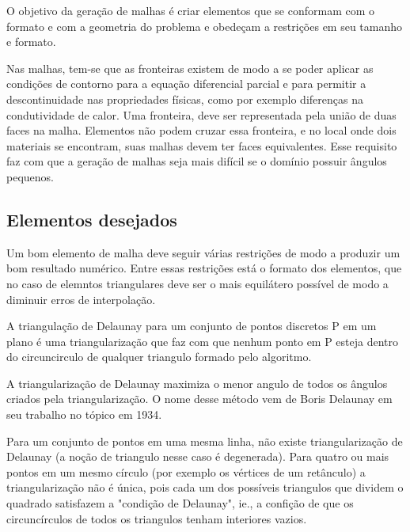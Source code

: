 O objetivo da geração de malhas é criar elementos que se conformam com o formato e com a geometria do problema e obedeçam a restrições em seu tamanho e formato.

Nas malhas, tem-se que as fronteiras existem de modo a se poder aplicar as condições de contorno para a equação diferencial parcial e para permitir a descontinuidade nas propriedades físicas, como por exemplo diferenças na condutividade de calor. Uma fronteira, deve ser representada pela união de duas faces na malha. Elementos não podem cruzar essa fronteira, e no local onde dois materiais se encontram, suas malhas devem ter faces equivalentes. Esse requisito faz com que a geração de malhas seja mais difícil se o domínio possuir ângulos pequenos.

\subsection{Elementos desejados}
Um bom elemento de malha deve seguir várias restrições de modo a produzir um bom resultado numérico. Entre essas restrições está o formato dos elementos, que no caso de elemntos triangulares deve ser o mais equilátero possível de modo a diminuir erros de interpolação.

A triangulação de Delaunay para um conjunto de pontos discretos P em um plano é uma triangularização que faz com que nenhum ponto em P esteja dentro do circuncirculo de qualquer triangulo formado pelo algoritmo.

A triangularização de Delaunay maximiza o menor angulo de todos os ângulos criados pela triangularização. O nome desse método vem de Boris Delaunay em seu trabalho no tópico em 1934.

Para um conjunto de pontos em uma mesma linha, não existe triangularização de Delaunay (a noção de triangulo nesse caso é degenerada). Para quatro ou mais pontos em um mesmo círculo (por exemplo os vértices de um retânculo) a triangularização não é única, pois cada um dos possíveis triangulos que dividem o quadrado satisfazem a "condição de Delaunay", ie., a confição de que os circuncírculos de todos os triangulos tenham interiores vazios.